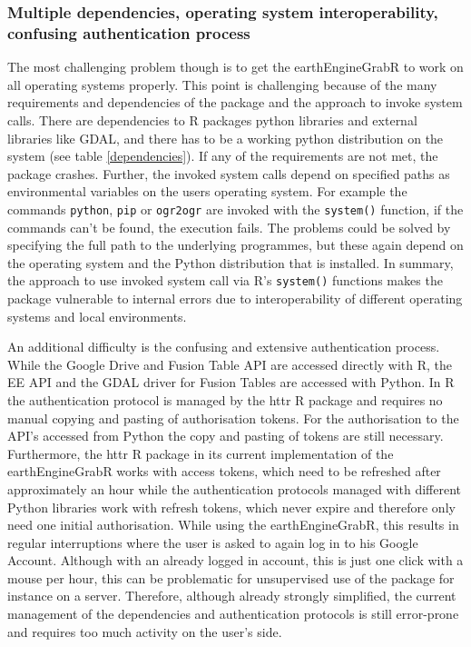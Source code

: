 \subsubsection{Multiple dependencies, operating system interoperability, confusing authentication process}

The most challenging problem though is to get the earthEngineGrabR to work on all operating systems properly. This point is challenging because of the many requirements and dependencies of the package and the approach to invoke system calls. There are dependencies to R packages python libraries and external libraries like GDAL, and there has to be a working python distribution on the system (see table \ref{dependencies}). If any of the requirements are not met, the package crashes. 
Further, the invoked system calls depend on specified paths as environmental variables on the users operating system. For example the commands \texttt{python}, \texttt{pip} or \texttt{ogr2ogr} are invoked with the \texttt{system()} function, if the commands can't be found, the execution fails. The problems could be solved by specifying the full path to the underlying programmes, but these again depend on the operating system and the Python distribution that is installed. In summary, the approach to use invoked system call via R's \texttt{system()} functions makes the package vulnerable to internal errors due to interoperability of different operating systems and local environments.

An additional difficulty is the confusing and extensive authentication process. While the Google Drive and Fusion Table API are accessed directly with R, the EE API and the GDAL driver for Fusion Tables are accessed with Python. In R the authentication protocol is managed by the httr R package and requires no manual copying and pasting of authorisation tokens. For the authorisation to the API's accessed from Python the copy and pasting of tokens are still necessary. 
Furthermore, the httr R package in its current implementation of the earthEngineGrabR works with access tokens, which need to be refreshed after approximately an hour while the authentication protocols managed with different Python libraries work with refresh tokens, which never expire and therefore only need one initial authorisation. While using the earthEngineGrabR, this results in regular interruptions where the user is asked to again log in to his Google Account. Although with an already logged in account, this is just one click with a mouse per hour, this can be problematic for unsupervised use of the package for instance on a  server. Therefore, although already strongly simplified, the current management of the dependencies and authentication protocols is still error-prone and requires too much activity on the user's side.

